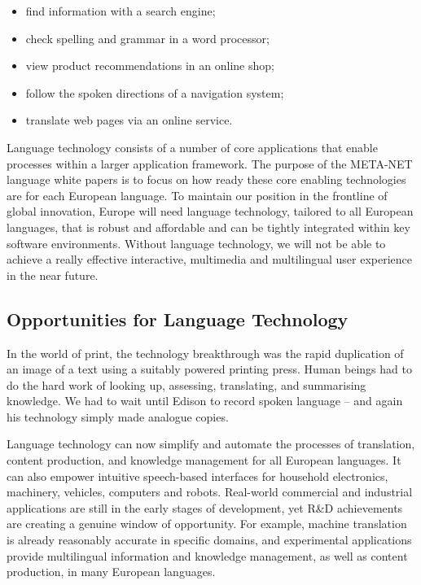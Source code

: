 \begin{multicols}{2}
\begin{itemize}
\item find information with a search engine;
\item check spelling and grammar in a word processor;
\item view product recommendations in an online shop;
\item follow the spoken directions of a navigation system;
\item translate web pages via an online service.
\end{itemize}

Language technology consists of a number of core applications that enable processes within a larger application framework. The purpose of the META-NET language white papers is to focus on how ready these core enabling technologies are for each European language. To maintain our position in the frontline of global innovation, Europe will need language technology, tailored to all European languages, that is robust and affordable and can be tightly integrated within key software environments. Without language technology, we will not be able to achieve a really effective interactive, multimedia and multilingual user experience in the near future.


\subsection{Opportunities for Language Technology}

In the world of print, the technology breakthrough was the rapid duplication of an image of a text using a suitably powered printing press. Human beings had to do the hard work of looking up, assessing, translating, and summarising knowledge. We had to wait until Edison to record spoken language -- and again his technology simply made analogue copies.

Language technology can now simplify and automate the processes of translation, content production, and knowledge management for all European languages. It can also empower intuitive speech-based interfaces for household electronics, machinery, vehicles, computers and robots. Real-world commercial and industrial applications are still in the early stages of development, yet R\&D achievements are creating a genuine window of opportunity. For example, machine translation is already reasonably accurate in specific domains, and experimental applications provide multilingual information and knowledge management, as well as content production, in many European languages.


\end{multicols}
